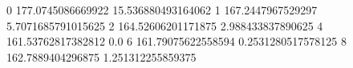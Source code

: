 0 177.0745086669922 15.536880493164062
1 167.2447967529297 5.7071685791015625
2 164.52606201171875 2.988433837890625
4 161.53762817382812 0.0
6 161.79075622558594 0.2531280517578125
8 162.7889404296875 1.251312255859375
